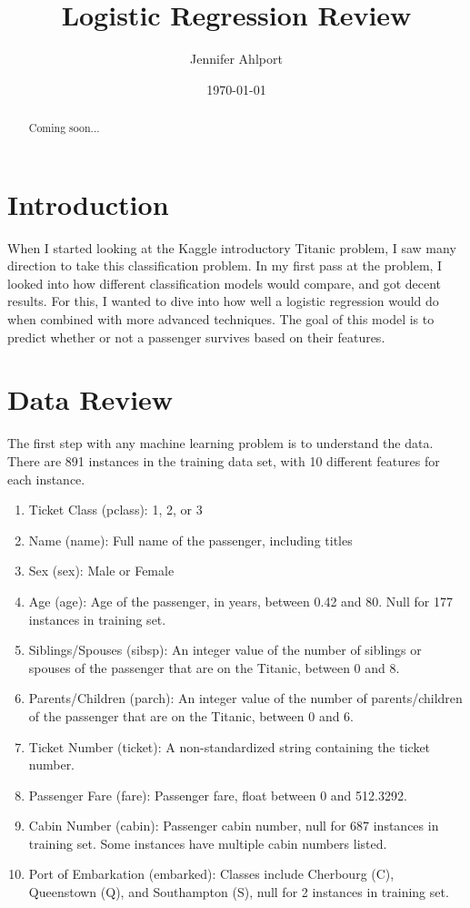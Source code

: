 \documentclass[12pt, letterpaper]{article}
\title{Logistic Regression Review}
\author{Jennifer Ahlport}
\date{\today}
\begin{document}
\maketitle

\begin{abstract}
    Coming soon...
\end{abstract}

\section{Introduction}
When I started looking at the Kaggle introductory Titanic problem, I saw many direction to take this classification problem. In my first pass at the problem, I looked into how different classification models would compare, and got decent results. For this, I wanted to dive into how well a logistic regression would do when combined with more advanced techniques. The goal of this model is to predict whether or not a passenger survives based on their features. 


\section{Data Review}
The first step with any machine learning problem is to understand the data. There are 891 instances in the training data set, with 10 different features for each instance. 

\begin{enumerate}
	\item Ticket Class (pclass): 1, 2, or 3
	\item Name (name): Full name of the passenger, including titles
	\item Sex (sex): Male or Female
	\item Age (age): Age of the passenger, in years, between 0.42 and 80. Null for 177 instances in training set. 
	\item Siblings/Spouses (sibsp): An integer value of the number of siblings or spouses of the passenger that are on the Titanic, between 0 and 8.
	\item Parents/Children (parch): An integer value of the number of parents/children of the passenger that are on the Titanic, between 0 and 6. 
	\item Ticket Number (ticket): A non-standardized string containing the ticket number. 
	\item Passenger Fare (fare): Passenger fare, float between 0 and 512.3292. 
	\item Cabin Number (cabin): Passenger cabin number, null for 687 instances in training set. Some instances have multiple cabin numbers listed.  
	\item Port of Embarkation (embarked): Classes include Cherbourg (C), Queenstown (Q), and Southampton (S), null for 2 instances in training set. 
\end{enumerate}
\end{document}
